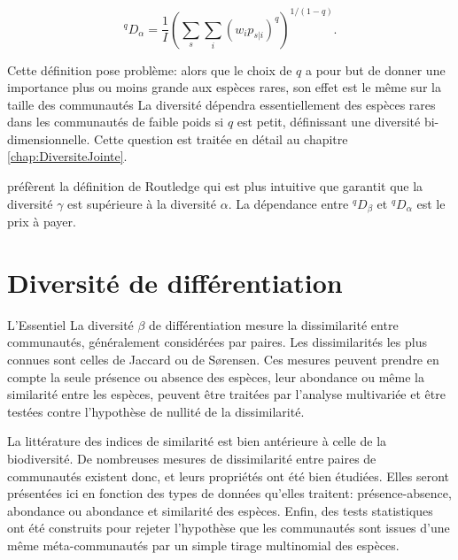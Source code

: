 \documentclass[
  11pt,
  french,
  a4paper,
  extrafontsizes,onecolumn,openright
  ]{memoir}
\newenvironment{Summary}
  {\begin{bclogo}[logo=\bctrombone, noborder=true, couleur=lightgray!50]{L'Essentiel}\parindent0pt}
  {\end{bclogo}}
\begin{document}
\begin{equation}
  \label{eq:Chiualpha}
  ^{q}\!D_{\alpha}=\frac{1}{I}{\left(\sum_s{\sum_i{{\left(w_ip_{s|i}\right)}^q}}\right)}^{{1}/{\left(1-q\right)}}.
\end{equation}

Cette définition pose problème: alors que le choix de \(q\) a pour but de donner une importance plus ou moins grande aux espèces rares, son effet est le même sur la taille des communautés La diversité dépendra essentiellement des espèces rares dans les communautés de faible poids si \(q\) est petit, définissant une diversité bi-dimensionnelle.
Cette question est traitée en détail au chapitre \ref{chap:DiversiteJointe}.

\textcite{Marcon2014a} préfèrent la définition de Routledge qui est plus intuitive que garantit que la diversité \(\gamma\) est supérieure à la diversité \(\alpha\).
La dépendance entre \(^{q}\!D_{\beta}\) et \(^{q}\!D_{\alpha}\) est le prix à payer.

\hypertarget{chap:BetaPaires}{%
\chapter{Diversité de différentiation}\label{chap:BetaPaires}}

\scriptsize

\begin{Summary}
La diversité \(\beta\) de différentiation mesure la dissimilarité entre
communautés, généralement considérées par paires. Les dissimilarités les
plus connues sont celles de Jaccard ou de Sørensen. Ces mesures peuvent
prendre en compte la seule présence ou absence des espèces, leur
abondance ou même la similarité entre les espèces, peuvent être traitées
par l'analyse multivariée et être testées contre l'hypothèse de nullité
de la dissimilarité.
\end{Summary}

\normalsize

La littérature des indices de similarité est bien antérieure à celle de la biodiversité.
De nombreuses mesures de dissimilarité entre paires de communautés existent donc, et leurs propriétés ont été bien étudiées.
Elles seront présentées ici en fonction des types de données qu'elles traitent: présence-absence, abondance ou abondance et similarité des espèces.
Enfin, des tests statistiques ont été construits pour rejeter l'hypothèse que les communautés sont issues d'une même méta-communautés par un simple tirage multinomial des espèces.
\end{document}
